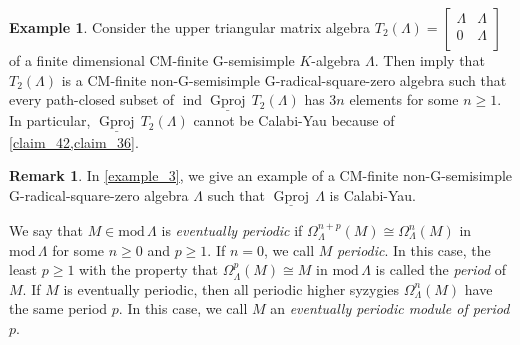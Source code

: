 \documentclass[12pt]{amsart}
\numberwithin{equation}{subsection}
\theoremstyle{plain}
\theoremstyle{definition}
\newtheorem{example}[theorem]{Example}
\newtheorem{remark}[theorem]{Remark}
\renewcommand{\mod}{\mathrm{mod}\,}
\newcommand{\sGproj}{\underline{\operatorname{Gproj}}\,}
\newcommand{\ind}{\operatorname{ind}}
\renewcommand{\L}{\Lambda}
\begin{document}
\begin{example}\label{example_8}
Consider the upper triangular matrix algebra $T_2(\L) = \begin{bmatrix}
        \L & \L \\
        0 & \L \\
\end{bmatrix}$ 
of a finite dimensional CM-finite G-semisimple $K$-algebra $\L$. 
Then \cite[Proposition 3.7, Lemma 5.5 and Theorem 5.8]{Hafezi-Bahlekeh_2024} imply that $T_2(\L)$ is a CM-finite non-G-semisimple G-radical-square-zero algebra such that every path-closed subset of $\ind\sGproj T_2(\L)$ has $3n$ elements for some $n\geq 1$. 
In particular, $\sGproj T_2(\L)$ cannot be Calabi-Yau because of \cref{claim_42,claim_36}.
\end{example}



\begin{remark}
In \cref{example_3}, we give an example of a CM-finite non-G-semisimple G-radical-square-zero algebra $\L$ such that $\sGproj\L$ is Calabi-Yau.
\end{remark}






We say that $M\in\mod\L$ is {\it eventually periodic} if $\Omega_\L^{n+p}(M) \cong \Omega_\L^{n}(M)$ in $\mod\L$ for some $n\geq 0$ and $p \geq 1$.
If $n=0$, we call $M$ {\it periodic}.
In this case, the least $p \geq 1$ with the property that $\Omega_\L^{p}(M) \cong M$ in $\mod\L$ is called the {\it period} of $M$.
If $M$ is eventually periodic, then all periodic higher syzygies $\Omega_\L^n(M)$ have the same period $p$.
In this case, we call $M$ an {\it eventually periodic module of period $p$}.
\end{document}
